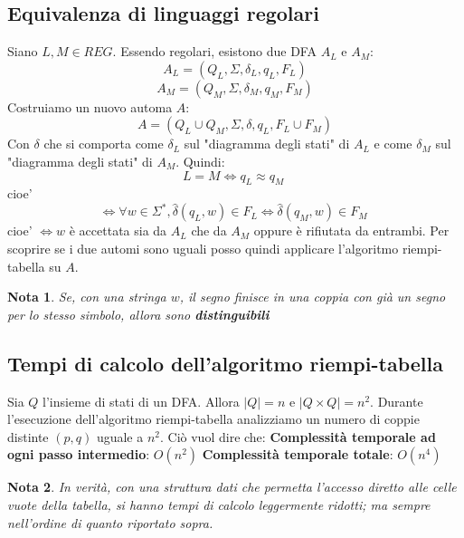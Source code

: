 \documentclass[12pt]{article}
\newtheorem{Nota}{Nota}[subsection]
\begin{document}
\subsection{Equivalenza di linguaggi regolari}
Siano $L, M \in REG$. Essendo regolari, esistono due DFA $A_L$ e $A_M$:
$$A_L = (Q_L, \Sigma, \delta_L, q_L, F_L)$$
$$A_M = (Q_M, \Sigma, \delta_M, q_M, F_M)$$
Costruiamo un nuovo automa $A$:
$$A = (Q_L \cup Q_M, \Sigma, \delta, q_L, F_L \cup F_M)$$
Con $\delta$ che si comporta come $\delta_L$ sul "diagramma degli stati" di $A_L$ e come $\delta_M$ sul "diagramma degli stati" di $A_M$. Quindi:
$$L = M \Leftrightarrow q_L \approx q_M \;$$ cioe' 
$$\Leftrightarrow \forall w \in \Sigma^*, \hat{\delta}(q_L, w) \in F_L \Leftrightarrow \hat{\delta}(q_M, w)\in F_M \;$$ cioe' \newline
$\Leftrightarrow w$ è accettata sia da $A_L$ che da $A_M$ oppure è rifiutata da entrambi. Per scoprire se i due automi sono uguali posso quindi applicare l'algoritmo riempi-tabella su $A$.
\begin{Nota}
    Se, con una stringa $w$, il segno finisce in una coppia con già un segno per lo stesso simbolo, allora sono \textbf{distinguibili}
\end{Nota}
\subsection{Tempi di calcolo dell'algoritmo riempi-tabella}
Sia $Q$ l'insieme di stati di un DFA. Allora $|Q| = n$ e $|Q \times Q| = n^2$. Durante l'esecuzione dell'algoritmo riempi-tabella analizziamo un numero di coppie distinte $(p, q)$ uguale a $n^2$. Ciò vuol dire che: \newline
\textbf{Complessità temporale ad ogni passo intermedio}: $O(n^2)$ \newline
\textbf{Complessità temporale totale}: $O(n^4)$
\begin{Nota}
    In verità, con una struttura dati che permetta l'accesso diretto alle celle vuote della tabella, si hanno tempi di calcolo leggermente ridotti; ma sempre nell'ordine di quanto riportato sopra.
\end{Nota}
\end{document}
